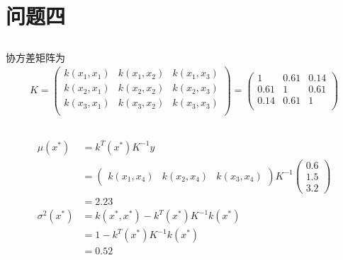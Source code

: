 \documentclass[12pt, a4paper]{article}
\begin{document}
\section{问题四}

\subsection{}

协方差矩阵为
\begin{align*}
    K=\begin{pmatrix}
        k(x_1,x_1)&k(x_1,x_2)&k(x_1,x_3)\\
        k(x_2,x_1)&k(x_2,x_2)&k(x_2,x_3)\\
        k(x_3,x_1)&k(x_3,x_2)&k(x_3,x_3)\\
    \end{pmatrix}
    =\begin{pmatrix}
        1 & 0.61 & 0.14 \\
        0.61 & 1 & 0.61 \\
        0.14 & 0.61 & 1\\
    \end{pmatrix}
\end{align*}

\subsection{}

\begin{align*}
    \mu(x^*)&=k^T(x^*)K^{-1}y\\
    &=\begin{pmatrix}
        k(x_1,x_4)&k(x_2,x_4)&k(x_3,x_4)
    \end{pmatrix} K^{-1}\begin{pmatrix}
        0.6\\ 1.5\\ 3.2
    \end{pmatrix}\\
    &=2.23\\
    \sigma^2(x^*)&=k(x^*,x^*)-k^T(x^*)K^{-1}k(x^*)\\
    &=1-k^T(x^*)K^{-1}k(x^*)\\
    &=0.52
\end{align*}

\subsection{}
\end{document}
